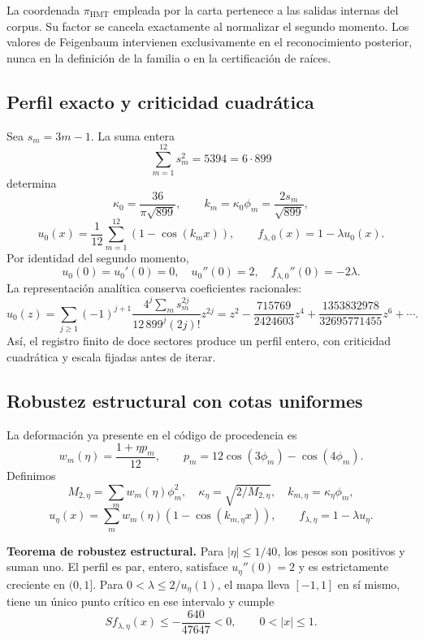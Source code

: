 La coordenada \(\pi_{\mathrm{HMT}}\) empleada por la carta pertenece a las salidas internas del corpus. Su factor se cancela exactamente al normalizar el segundo momento. Los valores de Feigenbaum intervienen exclusivamente en el reconocimiento posterior, nunca en la definición de la familia o en la certificación de raíces.


\subsection{Perfil exacto y criticidad cuadrática}
\label{hmtfg:desarrollo:2}

Sea \(s_m=3m-1\). La suma entera
\[
\sum_{m=1}^{12}s_m^2=5394=6\cdot899
\]
determina
\[
\kappa_0=\frac{36}{\pi\sqrt{899}},\qquad
k_m=\kappa_0\phi_m=\frac{2s_m}{\sqrt{899}},
\]
\[
u_0(x)=\frac1{12}\sum_{m=1}^{12}(1-\cos(k_mx)),\qquad
f_{\lambda,0}(x)=1-\lambda u_0(x).
\]
Por identidad del segundo momento,
\[
u_0(0)=u_0'(0)=0,\quad u_0''(0)=2,\quad
f_{\lambda,0}''(0)=-2\lambda.
\]
La representación analítica conserva coeficientes racionales:
\[
u_0(z)=\sum_{j\ge1}(-1)^{j+1}
\frac{4^j\sum_m s_m^{2j}}{12\,899^j(2j)!}z^{2j}
=z^2-\frac{715769}{2424603}z^4
+\frac{1353832978}{32695771455}z^6+\cdots.
\]
Así, el registro finito de doce sectores produce un perfil entero, con criticidad cuadrática y escala fijadas antes de iterar.


\subsection{Robustez estructural con cotas uniformes}
\label{hmtfg:desarrollo:3}

La deformación ya presente en el código de procedencia es
\[
w_m(\eta)=\frac{1+\eta p_m}{12},\qquad
p_m=12\cos(3\phi_m)-\cos(4\phi_m).
\]
Definimos
\[
M_{2,\eta}=\sum_mw_m(\eta)\phi_m^2,\quad
\kappa_\eta=\sqrt{2/M_{2,\eta}},\quad k_{m,\eta}=\kappa_\eta\phi_m,
\]
\[
u_\eta(x)=\sum_mw_m(\eta)(1-\cos(k_{m,\eta}x)),\qquad
f_{\lambda,\eta}=1-\lambda u_\eta.
\]

\textbf{Teorema de robustez estructural.} Para \(|\eta|\le1/40\), los pesos son positivos y suman uno. El perfil es par, entero, satisface \(u_\eta''(0)=2\) y es estrictamente creciente en \((0,1]\). Para \(0<\lambda\le2/u_\eta(1)\), el mapa lleva \([-1,1]\) en sí mismo, tiene un único punto crítico en ese intervalo y cumple
\[
S f_{\lambda,\eta}(x)\le-\frac{640}{47647}<0,\qquad0<|x|\le1.
\]

